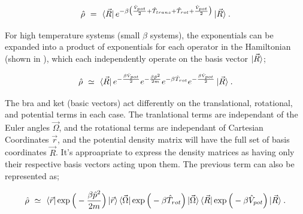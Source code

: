 \documentclass{ece}
\begin{document}
\begin{equation} \label{eq:38}
\hat{\rho} \hspace{0.125cm} = \hspace{0.125cm} \bra{\vec{R}}  e^{ - \beta \big( \frac{\hat{V}_{pot}}{2} + \hat{T}_{trans} + \hat{T}_{rot} + \frac{\hat{V}_{pot}}{2} \big)} \ket{\vec{R}} \hspace{0.025cm} . 
\end{equation}

For high temperature systems (small \begin{math} \beta \end{math} systems), the exponentials can be expanded into a product of exponentials for each operator in the Hamiltonian (shown in ), which each independently operate on the basis vector \begin{math} \ket{\vec{R}} \end{math};

\begin{equation} \label{eq:45}
\hat{\rho} \hspace{0.125cm} \simeq \hspace{0.125cm} \bra{\vec{R}} e^{- \frac{ \beta \hat{V}_{pot}}{2}} e^{- \frac{\beta \hat{p}^2}{2 m}} e^{-\beta \hat{T}_{rot}} e^{- \frac{ \beta \hat{V}_{pot}}{2}}  \ket{\vec{R}} \hspace{0.025cm} . \end{equation}

The bra and ket (basic vectors) act differently on the translational, rotational, and potential terms in each case. The tranlational terms are independant of the Euler angles \begin{math} \vec{\Omega} \end{math}, and the rotational terms are independant of Cartesian Coordinates \begin{math} \vec{r} \end{math}, and the potential density matrix will have the full set of basis coordinates \begin{math} \vec{R} \end{math}. It's approapriate to express the density matrices as having only their respective basis vectors acting upon them. The previous term can also be represented as;

\begin{equation} \label{eq:46}
\hat{\rho} \hspace{0.125cm} \simeq \hspace{0.125cm} \bra{\vec{r}} \exp \Big( - \frac{\beta \hat{p}^2}{2 m} \Big) \ket{\vec{r}} \bra{\vec{\Omega}} \exp \Big( - \beta \hat{T}_{rot} \Big) \ket{\vec{\Omega}} \bra{\vec{R}} \exp \Big( - \beta \hat{V}_{pot} \Big) \ket{\vec{R}} \hspace{0.025cm} . \end{equation}
\end{document}
